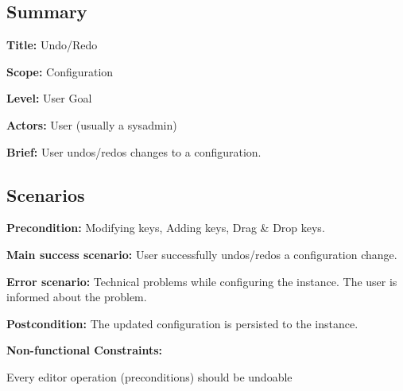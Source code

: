 \subsection*{Summary}


\begin{DoxyItemize}
\item {\bfseries Title\+:} Undo/\+Redo
\item {\bfseries Scope\+:} Configuration
\item {\bfseries Level\+:} User Goal
\item {\bfseries Actors\+:} User (usually a sysadmin)
\item {\bfseries Brief\+:} User undos/redos changes to a configuration.
\end{DoxyItemize}

\subsection*{Scenarios}


\begin{DoxyItemize}
\item {\bfseries Precondition\+:} Modifying keys, Adding keys, Drag \& Drop keys.
\item {\bfseries Main success scenario\+:} User successfully undos/redos a configuration change.
\item {\bfseries Error scenario\+:} Technical problems while configuring the instance. The user is informed about the problem.
\item {\bfseries Postcondition\+:} The updated configuration is persisted to the instance.
\item {\bfseries Non-\/functional Constraints\+:}
\begin{DoxyItemize}
\item Every editor operation (preconditions) should be undoable 
\end{DoxyItemize}
\end{DoxyItemize}